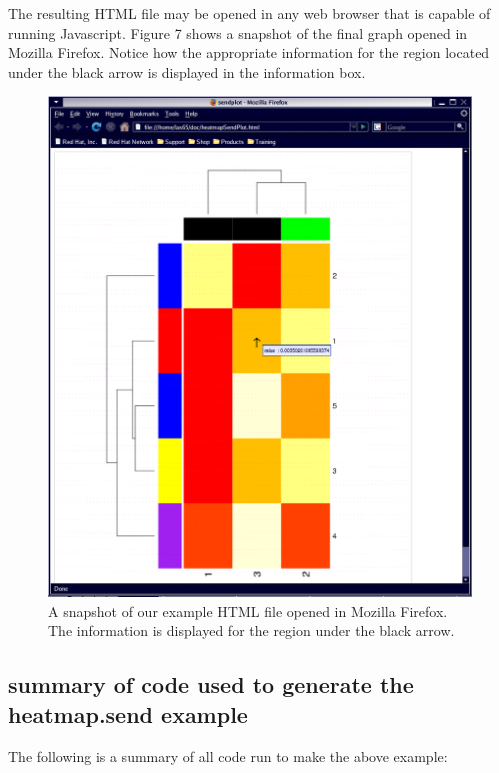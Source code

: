 \documentclass[]{article}
\begin{document}
The resulting HTML file may be opened in any web browser that is capable of running Javascript. Figure 7 shows a snapshot of the final graph opened in Mozilla Firefox. Notice how the appropriate information for the region located under the black arrow is displayed in the information box.
\begin{center}
\begin{figure}
\includegraphics{heatmapFirefox}
\caption{A snapshot of our example HTML file opened in Mozilla Firefox. The information is displayed for the region under the black arrow.}
\end{figure}
\end{center}

\subsection{summary of code used to generate the heatmap.send example}

The following is a summary of all code run to make the above example:
\end{document}
